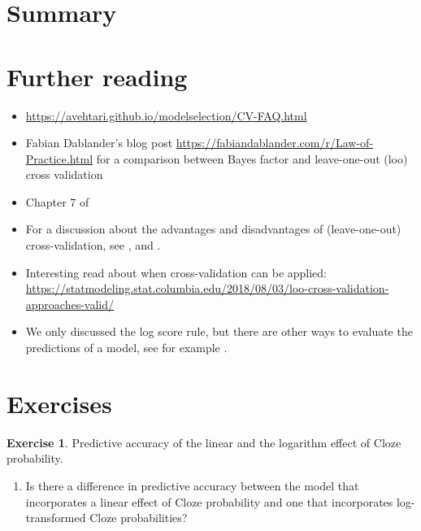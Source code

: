 \documentclass[12pt,]{krantz}
\providecommand{\tightlist}{%
  \setlength{\itemsep}{0pt}\setlength{\parskip}{0pt}}
\theoremstyle{definition}
\theoremstyle{definition}
\theoremstyle{definition}
\newtheorem{exercise}{Exercise}[chapter]
\theoremstyle{remark}
\begin{document}
\section{Summary}\label{summary-5}

\section{Further reading}\label{further-reading-7}

\begin{itemize}
\tightlist
\item
  \url{https://avehtari.github.io/modelselection/CV-FAQ.html}
\item
  Fabian Dablander's blog post
  \url{https://fabiandablander.com/r/Law-of-Practice.html} for a
  comparison between Bayes factor and leave-one-out (loo) cross
  validation
\item
  Chapter 7 of \citet{Gelman14}
\item
  For a discussion about the advantages and disadvantages of
  (leave-one-out) cross-validation, see
  \citet{gronauLimitationsBayesianLeaveOneOut2018},
  \citet{vehtariLimitationsLimitationsBayesian2019} and
  \citet{gronauRejoinderMoreLimitations}.
\item
  Interesting read about when cross-validation can be applied:
  \url{https://statmodeling.stat.columbia.edu/2018/08/03/loo-cross-validation-approaches-valid/}
\item
  We only discussed the log score rule, but there are other ways to
  evaluate the predictions of a model, see for example
  \citet{GneitingRaftery2007}.
\end{itemize}

\section{Exercises}\label{exercises-6}

\begin{exercise}
\protect\hypertarget{exr:logcv}{}{\label{exr:logcv} }Predictive accuracy of
the linear and the logarithm effect of Cloze probability.
\end{exercise}

\begin{enumerate}
\def\labelenumi{\alph{enumi}.}
\tightlist
\item
  Is there a difference in predictive accuracy between the model that
  incorporates a linear effect of Cloze probability and one that
  incorporates log-transformed Cloze probabilities? 
\end{enumerate}
\end{document}
